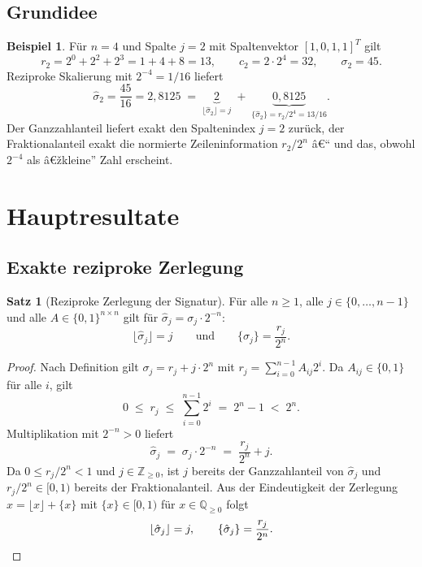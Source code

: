 ﻿\documentclass[a4paper,12pt]{article}
\theoremstyle{definition}
\newtheorem{beispiel}{Beispiel}
\newtheorem{satz}{Satz}
\begin{document}
\subsection{Grundidee}

\begin{beispiel}
	Für $n=4$ und Spalte $j=2$ mit Spaltenvektor $[1,0,1,1]^T$ gilt
	\[
		r_2 = 2^0 + 2^2 + 2^3 = 1 + 4 + 8 = 13, \qquad
		c_2 = 2 \cdot 2^4 = 32, \qquad
		\sigma_2 = 45.
	\]
	Reziproke Skalierung mit $2^{-4} = 1/16$ liefert
	\[
		\hat\sigma_2 = \frac{45}{16} = 2{,}8125
		\;=\; \underbrace{2}_{\lfloor \hat\sigma_2 \rfloor = j}
		\;+\; \underbrace{0{,}8125}_{\{\hat\sigma_2\} = r_2/2^4 = 13/16}.
	\]
	Der Ganzzahlanteil liefert exakt den Spaltenindex $j=2$ zurück, der
	Fraktionalanteil exakt die normierte Zeileninformation $r_2/2^n$ â€“
	und das, obwohl $2^{-4}$ als â€žkleine'' Zahl erscheint.
\end{beispiel}

\section{Hauptresultate}

\subsection{Exakte reziproke Zerlegung}

\begin{satz}[Reziproke Zerlegung der Signatur]
\label{satz:zerlegung}
	Für alle $n \geq 1$, alle $j \in \{0,\ldots,n-1\}$ und alle
	$A \in \{0,1\}^{n\times n}$ gilt für $\hat\sigma_j = \sigma_j \cdot 2^{-n}$:
	\[
		\lfloor \hat\sigma_j \rfloor = j
		\qquad\text{und}\qquad
		\{\hat\sigma_j\} = \frac{r_j}{2^n}.
	\]
\end{satz}

\begin{proof}
	Nach Definition gilt $\sigma_j = r_j + j\cdot 2^n$ mit
	$r_j = \sum_{i=0}^{n-1}A_{ij}2^i$. Da $A_{ij}\in\{0,1\}$ für alle $i$, gilt
	\[
		0 \;\leq\; r_j \;\leq\; \sum_{i=0}^{n-1} 2^i \;=\; 2^n - 1 \;<\; 2^n.
	\]
	Multiplikation mit $2^{-n} > 0$ liefert
	\[
		\hat\sigma_j \;=\; \sigma_j \cdot 2^{-n}
		\;=\; \frac{r_j}{2^n} + j.
	\]
	Da $0 \leq r_j/2^n < 1$ und $j \in \mathbb{Z}_{\geq 0}$, ist $j$ bereits der
	Ganzzahlanteil von $\hat\sigma_j$ und $r_j/2^n \in [0,1)$ bereits der
	Fraktionalanteil. Aus der Eindeutigkeit der Zerlegung
	$x = \lfloor x \rfloor + \{x\}$ mit $\{x\}\in[0,1)$ für $x \in \mathbb{Q}_{\geq0}$
	folgt
	\[
		\lfloor \hat\sigma_j \rfloor = j, \qquad \{\hat\sigma_j\} = \frac{r_j}{2^n}. \qedhere
	\]
\end{proof}
\end{document}
